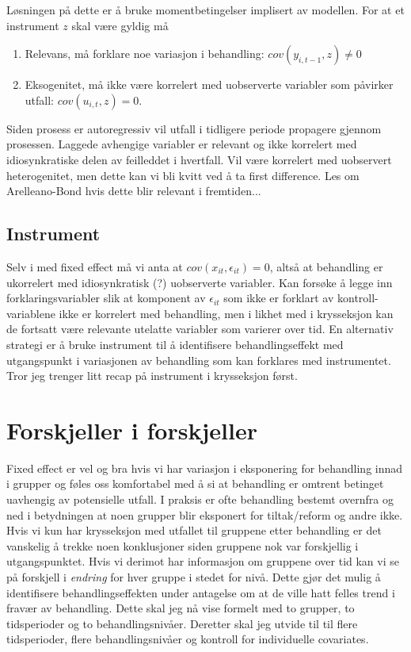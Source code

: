 Løsningen på dette er å bruke momentbetingelser implisert av modellen. For at et instrument $z$ skal være gyldig må
\begin{enumerate}
\item Relevans, må forklare noe variasjon i behandling: $cov(y_{i,t-1},z) \neq 0$
\item Eksogenitet, må ikke være korrelert med uobserverte variabler som påvirker utfall: $cov(u_{i,t},z)=0$.
\end{enumerate}
Siden prosess er autoregressiv vil utfall i tidligere periode propagere gjennom prosessen. Laggede avhengige variabler er relevant og ikke korrelert med idiosynkratiske delen av feilleddet i hvertfall. Vil være korrelert med uobservert heterogenitet, men dette kan vi bli kvitt ved å ta first difference. Les om Arelleano-Bond hvis dette blir relevant i fremtiden...
\subsection{Instrument}
Selv i med fixed effect må vi anta at $cov(x_{it},\epsilon_{it})=0$, altså at behandling er ukorrelert med idiosynkratisk (?) uobserverte variabler. Kan forsøke å legge inn forklaringsvariabler slik at komponent av $\epsilon_{it}$ som ikke er forklart av kontroll-variablene ikke er korrelert med behandling, men i likhet med i krysseksjon kan de fortsatt være relevante utelatte variabler som varierer over tid. En alternativ strategi er å bruke instrument til å identifisere behandlingseffekt med utgangspunkt i variasjonen av behandling som kan forklares med instrumentet. Tror jeg trenger litt recap på instrument i krysseksjon først.
\section{Forskjeller i forskjeller}
Fixed effect er vel og bra hvis vi har variasjon i eksponering for behandling innad i grupper og føles oss komfortabel med å si at behandling er omtrent betinget uavhengig av potensielle utfall. I praksis er ofte behandling bestemt overnfra og ned i betydningen at noen grupper blir eksponert for tiltak/reform og andre ikke. Hvis vi kun har krysseksjon med utfallet til gruppene etter behandling er det vanskelig å trekke noen konklusjoner siden gruppene nok var forskjellig i utgangspunktet. Hvis vi derimot har informasjon om gruppene over tid kan vi se på forskjell i \textit{endring} for hver gruppe i stedet for nivå. Dette gjør det mulig å identifisere behandlingseffekten under antagelse om at de ville hatt felles trend i fravær av behandling. Dette skal jeg nå vise formelt med to grupper, to tidsperioder og to behandlingsnivåer. Deretter skal jeg utvide til til flere tidsperioder, flere behandlingsnivåer og kontroll for individuelle covariates.
